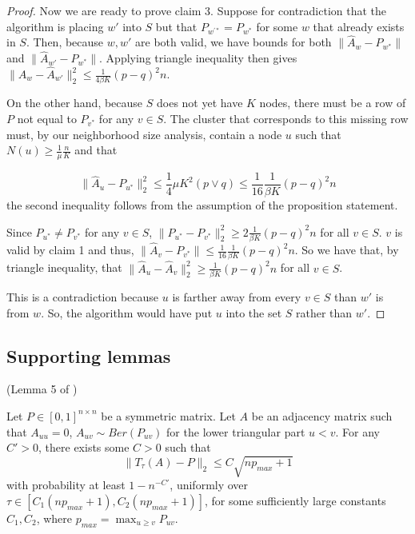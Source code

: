 \begin{proof}
Now we are ready to prove claim 3. Suppose for contradiction that the algorithm is placing $w'$ into $S$ but that $P_{w^{\prime *}} = P_{w^*}$ for some $w$ that already exists in $S$. Then, because $w, w'$ are both valid, we have bounds for both $\| \hat{A}_w - P_{w^*} \|$ and $\| \hat{A}_{w'} - P_{w^*} \|$. Applying triangle inequality then gives $\| \hat{A}_w - \hat{A}_{w'} \|_2^2 \leq \frac{1}{4 \beta K} (p - q)^2 n$. 

On the other hand, because $S$ does not yet have $K$ nodes, there must be a row of $P$ not equal to $P_{v^*}$ for any $v \in S$. The cluster that corresponds to this missing row must, by our neighborhood size analysis, 
contain a node $u$ such that $N(u) \geq \frac{1}{\mu} \frac{n}{K}$ and that

\[
\| \hat{A}_u - P_{u^*} \|_2^2 \leq \frac{1}{4} \mu K^2 (p \vee q)  \leq \frac{1}{16} \frac{1}{\beta K} (p-q)^2 n
\]
the second inequality follows from the assumption of the proposition statement.

Since $P_{u^*} \neq P_{v^*}$ for any $v \in S$, $\| P_{u^*} - P_{v^*} \|_2^2 \geq 2 \frac{1}{\beta K} (p-q)^2 n$ for all $v \in S$. $v$ is valid by claim 1 and thus, $\| \hat{A}_v - P_{v^*} \| \leq \frac{1}{16} \frac{1}{\beta K} (p - q)^2 n$. So we have that, by triangle inequality, that $\| \hat{A}_u - \hat{A}_v \|_2^2 \geq \frac{1}{\beta K} (p - q)^2 n$ for all $v \in S$. 

This is a contradiction because $u$ is farther away from every $v \in S$ than $w'$ is from $w$. So, the algorithm would have put $u$ into the set $S$ rather than $w'$.

\end{proof}



\subsection{Supporting lemmas}

\begin{lemma} (Lemma 5 of \cite{gao2015achieving}) \\
\label{lem:trimmed_A_bound}

Let $P \in [0,1]^{n \times n}$ be a symmetric matrix. Let $A$ be an adjacency matrix such that $A_{uu} = 0$, $A_{uv} \sim Ber(P_{uv})$ for the lower triangular part $u < v$. For any $C' > 0$, there exists some $C > 0$ such that
\[
\| T_\tau(A) - P \|_2 \leq C \sqrt{ n p_{max} + 1}
\]
with probability at least $1-n^{-C'}$, uniformly over $\tau \in [C_1 (np_{max} + 1), C_2 (np_{max} + 1)]$, for some sufficiently large constants $C_1, C_2$, where $p_{max} = \max_{u \geq v} P_{uv}$. 

\end{lemma}





